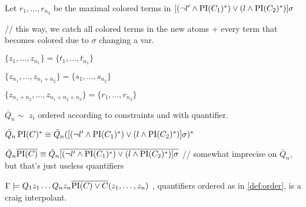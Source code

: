 \documentclass[,%
	paper=a4,%
	DIV14, 
	liststotoc,
	bibtotoc,
	draft=false,%
	numbers=noendperiod
]{scrartcl}
\begin{document}
\begin{defi}
\begin{itemize}
\begin{enumerate}
{						Let $r_1, \ldots, r_{n_3}$ be the maximal colored terms in $[ (\lnot l' \land \operatorname{PI}(C_1)^*) \lor (l \land \operatorname{PI}(C_2)^*) ] \sigma$

						// this way, we catch all colored terms in the new atoms + every term that becomes colored due to $\sigma$ changing a var.


						$\{ z_1, \ldots, z_{n_1} \} = \{t_1, \ldots, t_{n_1}\} $

						$\{ z_{n_1}, \ldots, z_{n_1+n_2} \} = \{s_1, \ldots, s_{n_2}\} $

						$\{ z_{n_1+n_2}, \ldots, z_{n_1+n_2+n_3} \} = \{r_1, \ldots, r_{n_3}\} $

						$\bar Q_n \sim $ $z_i$ ordered according to constraints and with quantifier. 

						$\bar Q_n \operatorname{PI}(C)^* \equiv \bar Q_n  ([ (\lnot l' \land \operatorname{PI}(C_1)^*) \lor (l \land \operatorname{PI}(C_2)^*) ] \sigma)^*$

						$\bar Q_n \overline{\operatorname{PI}(C)} \equiv \bar Q_n  \overline{[ (\lnot l' \land \operatorname{PI}(C_1)^*) \lor (l \land \operatorname{PI}(C_2)^*) ] \sigma}$
// somewhat imprecise on $\bar Q_n$, but that's just useless quantifiers


}

			\end{enumerate}
	\end{itemize}

\end{defi}

\clearpage
\begin{prop}
	$\Gamma \models Q_1 z_1 \ldots Q_n z_n \overline{\operatorname{PI}(C) \lor C}(z_1, \ldots, z_n)$ , quantifiers ordered as in \ref{def:order}, is a craig interpolant.
\end{prop}
\end{document}
